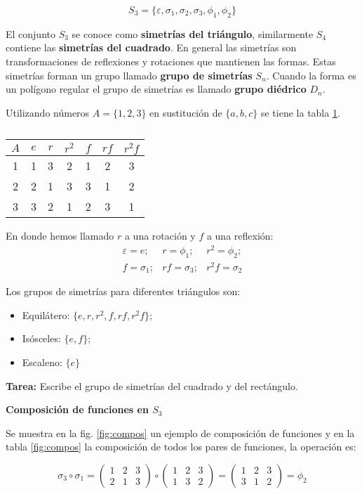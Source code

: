 \[ S_3 = \{ \varepsilon, \sigma_1, \sigma_2, \sigma_3, \phi_1, \phi_2\} \]

El conjunto $S_3$ se conoce como \textbf{simetrías del triángulo}, similarmente $S_4$ contiene las \textbf{simetrías del cuadrado}. En general las simetrías son transformaciones de reflexiones y rotaciones que mantienen las formas. Estas simetrías forman un grupo llamado \textbf{grupo de simetrías} $S_n$. Cuando la forma es un polígono regular el grupo de simetrías es llamado \textbf{grupo diédrico} $D_n$.

Utilizando números $A = \{1,2,3\}$ en sustitución de $\{a, b, c\}$ se tiene la tabla \ref{tab:S3}.
\begin{table}[h]
	\centering
	\begin{tabular}{|c|c|c|c|c|c|c|} \hline
		$A$ & $e$& $r$ & $r^2$ & $f$ & $rf$ & $r^2f$ \\ \hline
		1 & 1 & 3 & 2 & 1 & 2 & 3 \\ \hline
		2 & 2 & 1 & 3 & 3 & 1 & 2\\ \hline
		3 & 3 & 2 & 1 & 2 & 3 & 1\\ \hline
	\end{tabular}
	\caption{}
	\label{tab:S3}
\end{table}

En donde hemos llamado $r$ a una rotación y $f$ a una reflexión:
\[ \begin{array}{ccc}
	\varepsilon = e; & r = \phi_1; & r^2 = \phi_2;\\
	 f = \sigma_1; & rf = \sigma_3; & r^2f = \sigma_2
\end{array} \]

Los grupos de simetrías para diferentes triángulos son:

\begin{itemize}
	\item Equilátero: $\{ e, r, r^2, f, rf, r^2f \}$;
	\item Isósceles: $\{ e, f \}$;
	\item Escaleno: $\{ e \}$
\end{itemize}

\textbf{Tarea:}
Escribe el grupo de simetrías del cuadrado y del rectángulo.

\textbf{Composición de funciones en $S_3$}

Se muestra en la fig. \ref{fig:compos} un ejemplo de composición de funciones y en la tabla \ref{fig:compos} la composición de todos los pares de funciones, la operación es:

\[ \sigma_3 \circ \sigma_1 = \begin{pmatrix}
	1 & 2 & 3\\
	2 & 1 & 3
\end{pmatrix} \circ \begin{pmatrix}
	1 & 2 & 3\\
	1 & 3 & 2
\end{pmatrix} = \begin{pmatrix}
	1 & 2 & 3\\
	3 & 1 & 2
\end{pmatrix} = \phi_2\]

